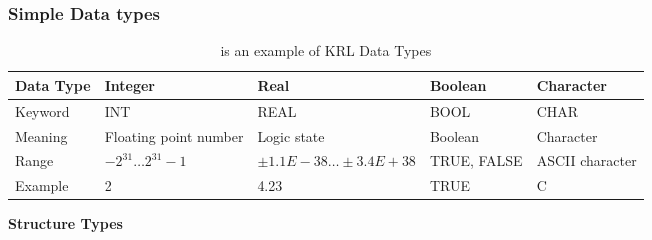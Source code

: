 \documentclass[a4paper]{report}
\begin{document}
\subsubsection{Simple Data types }
 
\begin{table}[h!]
	\centering
\begin{tabular}{| p{2cm} |p{3cm}|p{3cm}| p{2cm}| p{2cm}|}
	\hline
	\large Data Type & \large Integer & \large Real &\large Boolean &\large Character\\
	\hline
	\large Keyword & \large INT & \large REAL &\large BOOL &\large CHAR\\
	\hline
	\large Meaning & \large Floating point number & \large Logic state &\large Boolean &\large Character\\
	\hline
	\large Range & \large $-2^31 … 2^31-1$ & \large $±1.1E-38 … ±3.4E+38$ &\large TRUE, FALSE &\large ASCII character\\
	\hline
	\large Example & \large 2 & \large 4.23 &\large TRUE &\large C\\
	\hline

\end{tabular}
	\caption{is an example of KRL Data Types}
\label{table:1}
\end{table}
\newpage

\large {\textbf {Structure Types}}
\end{document}
